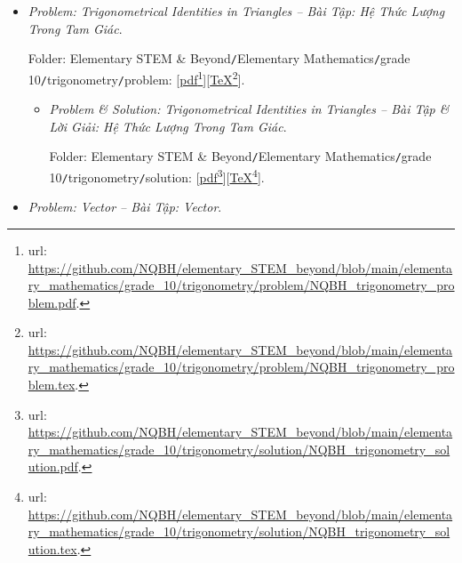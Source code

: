 \documentclass[12pt]{article}
\begin{document}
\begin{itemize}
\begin{itemize}
		Folder: {\sf Elementary STEM \& Beyond{\tt/}Elementary Mathematics{\tt/}grade 10{\tt/}function graph{\tt/}solution}: [\href{https://github.com/NQBH/elementary_STEM_beyond/blob/main/elementary_mathematics/grade_10/function_graph/solution/NQBH_function_graph_solution.pdf}{pdf}\footnote{{\sc url}: \url{https://github.com/NQBH/elementary_STEM_beyond/blob/main/elementary_mathematics/grade_10/function_graph/solution/NQBH_function_graph_solution.pdf}.}][\href{https://github.com/NQBH/elementary_STEM_beyond/blob/main/elementary_mathematics/grade_10/function_graph/solution/NQBH_function_graph_solution.tex}{\TeX}\footnote{{\sc url}: \url{https://github.com/NQBH/elementary_STEM_beyond/blob/main/elementary_mathematics/grade_10/function_graph/solution/NQBH_function_graph_solution.tex}.}].
	\end{itemize}
	\item {\it Problem: Trigonometrical Identities in Triangles -- Bài Tập: Hệ Thức Lượng Trong Tam Giác}.
	
	Folder: {\sf Elementary STEM \& Beyond{\tt/}Elementary Mathematics{\tt/}grade 10{\tt/}trigonometry{\tt/}problem}: [\href{https://github.com/NQBH/elementary_STEM_beyond/blob/main/elementary_mathematics/grade_10/trigonometry/problem/NQBH_trigonometry_problem.pdf}{pdf}\footnote{{\sc url}: \url{https://github.com/NQBH/elementary_STEM_beyond/blob/main/elementary_mathematics/grade_10/trigonometry/problem/NQBH_trigonometry_problem.pdf}.}][\href{https://github.com/NQBH/elementary_STEM_beyond/blob/main/elementary_mathematics/grade_10/trigonometry/problem/NQBH_trigonometry_problem.tex}{\TeX}\footnote{{\sc url}: \url{https://github.com/NQBH/elementary_STEM_beyond/blob/main/elementary_mathematics/grade_10/trigonometry/problem/NQBH_trigonometry_problem.tex}.}].
	\begin{itemize}
		\item {\it Problem \& Solution: Trigonometrical Identities in Triangles -- Bài Tập \& Lời Giải: Hệ Thức Lượng Trong Tam Giác}.
		
		Folder: {\sf Elementary STEM \& Beyond{\tt/}Elementary Mathematics{\tt/}grade 10{\tt/}trigonometry{\tt/}solution}: [\href{https://github.com/NQBH/elementary_STEM_beyond/blob/main/elementary_mathematics/grade_10/trigonometry/solution/NQBH_trigonometry_solution.pdf}{pdf}\footnote{{\sc url}: \url{https://github.com/NQBH/elementary_STEM_beyond/blob/main/elementary_mathematics/grade_10/trigonometry/solution/NQBH_trigonometry_solution.pdf}.}][\href{https://github.com/NQBH/elementary_STEM_beyond/blob/main/elementary_mathematics/grade_10/trigonometry/solution/NQBH_trigonometry_solution.tex}{\TeX}\footnote{{\sc url}: \url{https://github.com/NQBH/elementary_STEM_beyond/blob/main/elementary_mathematics/grade_10/trigonometry/solution/NQBH_trigonometry_solution.tex}.}].
	\end{itemize}
	\item {\it Problem: Vector -- Bài Tập: Vector}.
	

\end{itemize}
\end{document}
